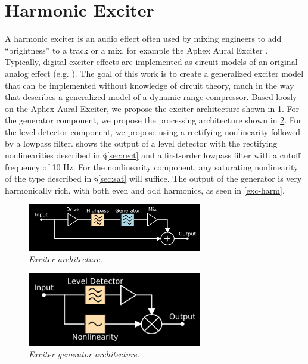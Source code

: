 \documentclass[twoside,a4paper]{article}
\begin{document}
\section{Harmonic Exciter} \label{sec:exciter}
%
A harmonic exciter is an audio effect often used by mixing
engineers to add ``brightness'' to a track or a mix, for example
the Aphex Aural Exciter \cite{aphex}. Typically, digital exciter effects
are implemented as circuit models of an original analog effect (e.g.
\cite{exciter-model}). The goal of this work is to create a
generalized exciter model that can be implemented without knowledge of
circuit theory, much in the way that \cite{giannoulis2012digital} describes
a generalized model of a dynamic range compressor.
\newline\newline
Based loosly on the Aphex Aural Exciter, we propose the
exciter architecture shown in \cref{exc}. For the generator
component, we propose the processing architecture shown in
\cref{gen}.
\newline\newline
For the level detector component, we propose using a rectifying
nonlinearity followed by a lowpass filter.  shows the
output of a level detector with the rectifying nonlinearities described
in \S\ref{sec:rect} and a first-order lowpass filter with a cutoff
frequency of 10 Hz. For the nonlinearity component, any saturating
nonlinearity of the type described in \S\ref{sec:sat} will suffice. The
output of the generator is very harmonically rich, with both even and odd
harmonics, as seen in \cref{exc-harm}.
\newline\newline
%
\begin{figure}[!htb]
    \center
    \includegraphics[width=3in]{../Exciter/Pics/Exciter_FullArch.png}
    \caption{\label{exc}{\it Exciter architecture.}}
\end{figure}
%
\begin{figure}[!htb]
    \center
    \includegraphics[width=3in]{../Exciter/Pics/Exciter_Arch.png}
    \caption{\label{gen}{\it Exciter generator architecture.}}
\end{figure}
\end{document}
